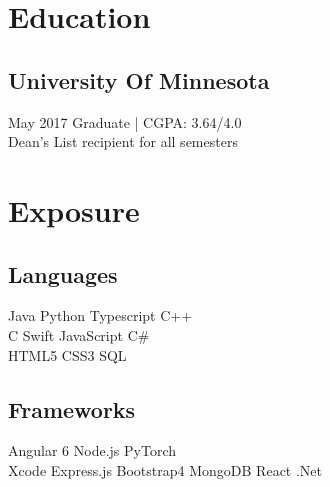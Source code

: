 \documentclass[]{rinkal_resume}
\begin{document}
%
%


%
%

\begin{minipage}[t]{0.30\textwidth} 


\section{Education} 

\subsection{University Of Minnesota}
\small May 2017  Graduate | CGPA: 3.64/4.0 \\
\small Dean's List recipient for all semesters
\sectionsep


\section{Exposure}
\subsection{Languages}
\vspace{1pt}
Java \textbullet{} 
Python \textbullet{}
Typescript \textbullet{}
C++ \textbullet{} \\
C \textbullet{}
Swift \textbullet{} 
JavaScript \textbullet{} 
C\# \textbullet{} \\
HTML5 \textbullet{} 
CSS3 \textbullet{}
SQL \textbullet{}
\sectionsep

\vspace{1pt}
\subsection{Frameworks}
\vspace{1pt}
Angular 6 \textbullet{}
Node.js \textbullet{}
PyTorch \textbullet{} \\
Xcode \textbullet{}
Express.js \textbullet{}
Bootstrap4 \textbullet{}
MongoDB \textbullet{}
React \textbullet{}
.Net \textbullet{}
\sectionsep


\end{minipage}
\end{document}
